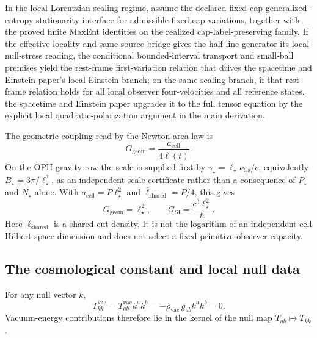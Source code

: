 \begin{theorem}
In the local Lorentzian scaling regime, assume the declared fixed-cap generalized-entropy
stationarity interface for admissible fixed-cap variations, together with the proved finite MaxEnt
identities on the realized cap-label-preserving family.  If the effective-locality and same-source
bridge gives the half-line generator its local null-stress reading, the conditional bounded-interval
transport and small-ball premises yield the rest-frame first-variation
relation that drives the spacetime and Einstein paper's local Einstein branch; on the same scaling branch, if that
rest-frame relation holds for all local observer four-velocities and all reference states, the
spacetime and Einstein paper upgrades it to the full tensor equation by the explicit local quadratic-polarization
argument in the main derivation.
\end{theorem}

\begin{theorem}
The geometric coupling read by the Newton area law is
\[
G_{\mathrm{geom}}=\frac{a_{\mathrm{cell}}}{4\bar{\ell}(t)}.
\]
On the OPH gravity row the scale is supplied first by
\(\gamma_\star=\ell_\star\nu_{\mathrm{Cs}}/c\), equivalently
\(B_\star=3\pi/\ell_\star^2\), as an independent scale certificate rather than a consequence of
\(P_\star\) and \(N_\star\) alone. With
\(a_{\mathrm{cell}}=P\ell_\star^2\) and \(\bar{\ell}_{\mathrm{shared}}=P/4\), this gives
\[
G_{\mathrm{geom}}=\ell_\star^2,
\qquad
G_{\mathrm{SI}}=\frac{c^3\ell_\star^2}{\hbar}.
\]
Here \(\bar{\ell}_{\mathrm{shared}}\) is a shared-cut density. It is not the logarithm of an
independent cell Hilbert-space dimension and does not select a fixed primitive observer capacity.
\end{theorem}

\subsection{The cosmological constant and local null data}

\begin{lemma}
For any null vector \(k\),
\[
T^{\mathrm{vac}}_{kk}
=
T^{\mathrm{vac}}_{ab}k^ak^b
=
-\rho_{\mathrm{vac}}\,g_{ab}k^ak^b
=
0.
\]
Vacuum-energy contributions therefore lie in the kernel of the null map
\(T_{ab}\mapsto T_{kk}\).
\end{lemma}

